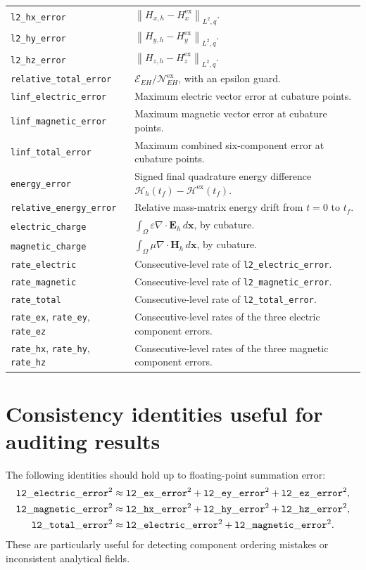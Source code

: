 \documentclass[11pt]{article}
\newcommand{\vect}[1]{\boldsymbol{#1}}
\newcommand{\norm}[1]{\left\lVert #1 \right\rVert}
\newcommand{\code}[1]{\nolinkurl{#1}}
\newcommand{\mcode}[1]{\mathtt{\detokenize{#1}}}
\newcommand{\Eh}{\vect E_h}
\newcommand{\Hh}{\vect H_h}
\begin{document}
\begin{longtable}{>{\raggedright\arraybackslash}p{}
                  >{\raggedright\arraybackslash}p{}}
\code{l2_hx_error} & \(\norm{H_{x,h}-H_x^{\mathrm{ex}}}_{L^2,q}\). \\
\code{l2_hy_error} & \(\norm{H_{y,h}-H_y^{\mathrm{ex}}}_{L^2,q}\). \\
\code{l2_hz_error} & \(\norm{H_{z,h}-H_z^{\mathrm{ex}}}_{L^2,q}\). \\
\code{relative_total_error} &
\(\mathcal E_{EH}/\mathcal N_{EH}^{\mathrm{ex}}\), with an epsilon guard.
\\
\code{linf_electric_error} & Maximum electric vector error at cubature points. \\
\code{linf_magnetic_error} & Maximum magnetic vector error at cubature points. \\
\code{linf_total_error} & Maximum combined six-component error at cubature points. \\
\code{energy_error} &
Signed final quadrature energy difference
\(\mathcal H_h(t_f)-\mathcal H^{\mathrm{ex}}(t_f)\).
\\
\code{relative_energy_error} &
Relative mass-matrix energy drift from \(t=0\) to \(t_f\).
\\
\code{electric_charge} &
\(\int_\Omega\varepsilon\nabla\cdot\Eh\,d\vect x\), by cubature.
\\
\code{magnetic_charge} &
\(\int_\Omega\mu\nabla\cdot\Hh\,d\vect x\), by cubature.
\\
\code{rate_electric} & Consecutive-level rate of \code{l2_electric_error}. \\
\code{rate_magnetic} & Consecutive-level rate of \code{l2_magnetic_error}. \\
\code{rate_total} & Consecutive-level rate of \code{l2_total_error}. \\
\code{rate_ex}, \code{rate_ey}, \code{rate_ez} &
Consecutive-level rates of the three electric component errors.
\\
\code{rate_hx}, \code{rate_hy}, \code{rate_hz} &
Consecutive-level rates of the three magnetic component errors.
\\
\bottomrule
\end{longtable}
\normalsize

\section{Consistency identities useful for auditing results}

The following identities should hold up to floating-point summation error:
\begin{align}
  \mcode{l2_electric_error}^2
  &\approx
  \mcode{l2_ex_error}^2+
  \mcode{l2_ey_error}^2+
  \mcode{l2_ez_error}^2,\\
  \mcode{l2_magnetic_error}^2
  &\approx
  \mcode{l2_hx_error}^2+
  \mcode{l2_hy_error}^2+
  \mcode{l2_hz_error}^2,\\
  \mcode{l2_total_error}^2
  &\approx
  \mcode{l2_electric_error}^2+
  \mcode{l2_magnetic_error}^2.
\end{align}
These are particularly useful for detecting component ordering mistakes or
inconsistent analytical fields.
\end{document}
